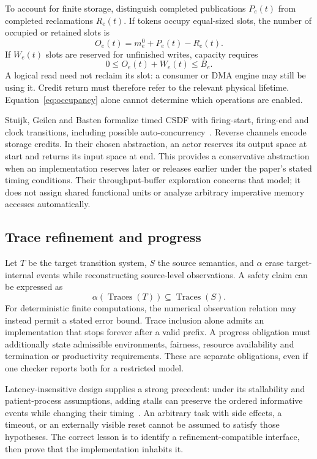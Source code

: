 \documentclass[final,3p,times,authoryear]{elsarticle}
\begin{document}
To account for finite storage, distinguish completed publications $P_e(t)$ from completed reclamations $R_e(t)$. If tokens occupy equal-sized slots, the number of occupied or retained slots is
\begin{equation}\label{eq:occupancy}
 O_e(t)=m_e^0+P_e(t)-R_e(t).
\end{equation}
If $W_e(t)$ slots are reserved for unfinished writes, capacity requires
\begin{equation}\label{eq:capacity}
 0\le O_e(t)+W_e(t)\le B_e.
\end{equation}
A logical read need not reclaim its slot: a consumer or DMA engine may still be using it. Credit return must therefore refer to the relevant physical lifetime. Equation~\eqref{eq:occupancy} alone cannot determine which operations are enabled.

Stuijk, Geilen and Basten formalize timed CSDF with firing-start, firing-end and clock transitions, including possible auto-concurrency~\citep{stuijk2008}. Reverse channels encode storage credits. In their chosen abstraction, an actor reserves its output space at start and returns its input space at end. This provides a conservative abstraction when an implementation reserves later or releases earlier under the paper's stated timing conditions. Their throughput-buffer exploration concerns that model; it does not assign shared functional units or analyze arbitrary imperative memory accesses automatically.

\subsection{Trace refinement and progress}
Let $T$ be the target transition system, $S$ the source semantics, and $\alpha$ erase target-internal events while reconstructing source-level observations. A safety claim can be expressed as
\begin{equation}
 \alpha(\operatorname{Traces}(T))\subseteq\operatorname{Traces}(S).
\end{equation}
For deterministic finite computations, the numerical observation relation may instead permit a stated error bound. Trace inclusion alone admits an implementation that stops forever after a valid prefix. A progress obligation must additionally state admissible environments, fairness, resource availability and termination or productivity requirements. These are separate obligations, even if one checker reports both for a restricted model.

Latency-insensitive design supplies a strong precedent: under its stallability and patient-process assumptions, adding stalls can preserve the ordered informative events while changing their timing~\citep{carloni2001}. An arbitrary task with side effects, a timeout, or an externally visible reset cannot be assumed to satisfy those hypotheses. The correct lesson is to identify a refinement-compatible interface, then prove that the implementation inhabits it.
\end{document}
